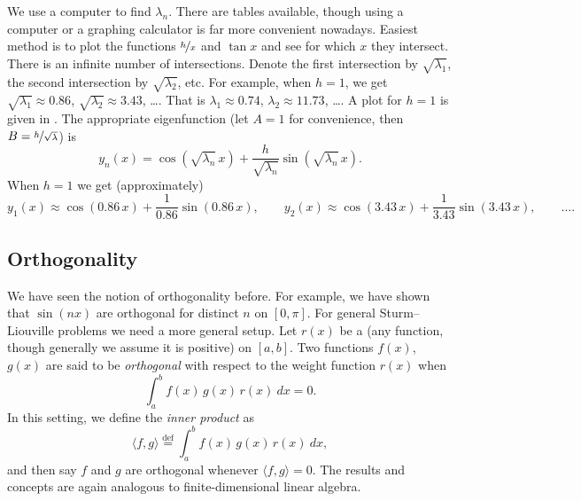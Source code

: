 \begin{example}
We use a computer to find $\lambda_n$.  There are tables available,
though using a computer or a graphing calculator
is far more convenient nowadays.
Easiest method is to plot the functions 
$\nicefrac{h}{x}$ and $\tan x$ and see for which $x$ they intersect.
There is an infinite number of intersections.  Denote
the first intersection
by $\sqrt{\lambda_1}$,
the second intersection by $\sqrt{\lambda_2}$, etc.
For example, when
$h=1$, we get $\sqrt{\lambda_1} \approx 0.86$, 
$\sqrt{\lambda_2} \approx 3.43$, \ldots.
That is $\lambda_1 \approx 0.74$, $\lambda_2 \approx 11.73$, \ldots.
A plot for $h=1$ is given in .
The appropriate eigenfunction
(let $A = 1$ for convenience, then
$B=\nicefrac{h}{\sqrt{\lambda}}$) is
\begin{equation*}
y_n(x) = \cos ( \sqrt{\lambda_n}\, x ) + \frac{h}{\sqrt{\lambda_n}}
\sin (\sqrt{\lambda_n} \, x ) .
\end{equation*}
When $h=1$ we get (approximately)
\begin{equation*}
y_1(x) \approx \cos (0.86\, x ) + \frac{1}{0.86}
\sin (0.86 \, x ) , \qquad
y_2(x) \approx \cos (3.43\, x ) + \frac{1}{3.43}
\sin (3.43 \, x ) , \qquad \ldots .
\end{equation*}
\begin{myfig}
\capstart
{}
\caption{Plot of $\frac{1}{x}$ and $\tan x$.%
\label{sl:tanx1overxfig}}
\end{myfig}
\end{example}

\subsection{Orthogonality}

We have seen the notion of orthogonality before.  For example,
we have shown that $\sin (nx)$ are orthogonal for distinct $n$ on $[0,\pi]$.
For general Sturm--Liouville problems we need a more general setup.
Let $r(x)$
be a \emph{} (any function, though generally we
assume it is positive) on $[a,b]$.  Two functions $f(x)$, $g(x)$
are said to be
\emph{orthogonal} 
with respect to the weight function
$r(x)$ when
\begin{equation*}
\int_a^b f(x) \, g(x) \, r(x) ~dx = 0 .
\end{equation*}
In this setting,
we define the \emph{inner product} as
\begin{equation*}
\langle f , g \rangle \overset{\text{def}}{=} \int_a^b f(x) \, g(x) \, r(x) ~dx ,
\end{equation*}
and then say $f$ and $g$ are orthogonal whenever $\langle f , g \rangle = 0$.
The results and concepts are again analogous to 
finite-dimensional linear algebra.


